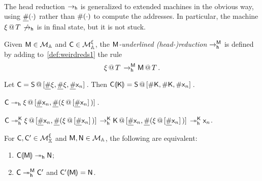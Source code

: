 \begin{defi}\label{def:weirdreds}\
\bsub
\item\label{def:weirdreds1}
	The head reduction $\redh$ is generalized to extended machines in the obvious way, using $\Lup(\cdot)$ rather than $\Lookup{(\cdot)}$ to compute the addresses.
In particular, the machine $\appT{\xi}{T}\not\redh$ is in final state, but it is not stuck.
\item\label{def:weirdreds2}
	Given $\mM\in\cM$ and $\C\in\cM^\xi$, the \emph{$\mM$-underlined (head-)reduction} $\ured$ is defined by adding to~\ref{def:weirdreds1} the rule
\[
	\appT{\xi}{T}\ured\appT{\mM}{T}.
\]
\esub
\end{defi}

\begin{exas} Let $\C = \append{\mS}{\Lup \xi,\Lup\xi,\Lup \mach{x}_n}$. Then $\C\hole{\mach{K}} = \append{\mS}{\Lookup \mach{K},\Lookup\mach{K},\Lookup \mach{x}_n}$.
\bsub
\item $\C\reddh \append{\xi}{\Lup\mach{x}_n,\Lup{(\append{\xi}{\Lup\mach{x}_n})}}$.
\item$\C\uredd[K] \append{\xi}{\Lup\mach{x}_n,\Lup{(\append{\xi}{\Lup\mach{x}_n})}}
\ured[K]\append{\mach{K}}{\Lup\mach{x}_n,\Lup{(\append{\xi}{\Lup\mach{x}_n})}}\uredd[K] \mach{x}_n$.
\esub
\end{exas}

\begin{lem}\label{lem:chemmeserve}
	For $\C,\C'\in\cMX$ and $\mM,\mN\in\cM$, the following are equivalent:
	\begin{enumerate}
	\item\label{lem:chemmeserve1} $\C\hole{\mM}\reddh \mN$;
	\item\label{lem:chemmeserve2} $\C\reddh^\mM\C'$ and $\C'\hole{\mM} = \mN$.
	\end{enumerate}
\end{lem}

